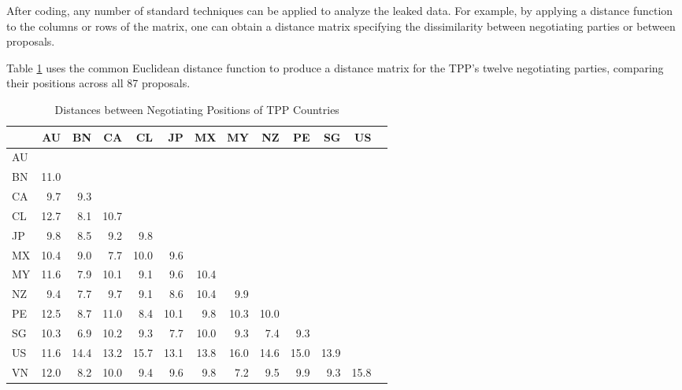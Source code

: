 \documentclass[12pt]{article}
\begin{document}
After coding, any number of standard techniques can be applied 
to analyze the leaked data. For example, by applying a distance function to the columns or rows of 
the matrix, one can obtain a distance matrix specifying the dissimilarity between negotiating 
parties or between proposals. 

Table \ref{tbl_tpp_dist} uses the common Euclidean distance function 
to produce a 
distance matrix for the TPP's twelve negotiating parties, comparing their positions across all 
87 proposals.

\begin{table}[ht]
\centering
\caption{Distances between Negotiating Positions of TPP Countries}
\label{tbl_tpp_dist}
\begin{tabular}{lrrrrrrrrrrrr}
  \hline
 & AU & BN & CA & CL & JP & MX & MY & NZ & PE & SG & US \\ 
  \hline
AU &  &  &  &  &  &  &  &  &  &  &  \\ 
  BN & 11.0 &  &  &  &  &  &  &  &  &  &  \\ 
  CA & 9.7 & 9.3 &  &  &  &  &  &  &  &  &  \\ 
  CL & 12.7 & 8.1 & 10.7 &  &  &  &  &  &  &  &  \\ 
  JP & 9.8 & 8.5 & 9.2 & 9.8 &  &  &  &  &  &  &  \\ 
  MX & 10.4 & 9.0 & 7.7 & 10.0 & 9.6 &  &  &  &  &  &  \\ 
  MY & 11.6 & 7.9 & 10.1 & 9.1 & 9.6 & 10.4 &  &  &  &  &  \\ 
  NZ & 9.4 & 7.7 & 9.7 & 9.1 & 8.6 & 10.4 & 9.9 &  &  &  &  \\ 
  PE & 12.5 & 8.7 & 11.0 & 8.4 & 10.1 & 9.8 & 10.3 & 10.0 &  &  &  \\ 
  SG & 10.3 & 6.9 & 10.2 & 9.3 & 7.7 & 10.0 & 9.3 & 7.4 & 9.3 &  &  \\ 
  US & 11.6 & 14.4 & 13.2 & 15.7 & 13.1 & 13.8 & 16.0 & 14.6 & 15.0 & 13.9 &  \\ 
  VN & 12.0 & 8.2 & 10.0 & 9.4 & 9.6 & 9.8 & 7.2 & 9.5 & 9.9 & 9.3 & 15.8 \\ 
\hline
\end{tabular}
\end{table}
\end{document}
